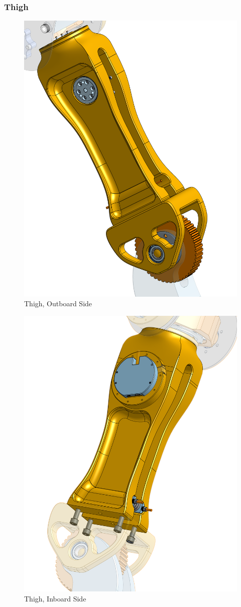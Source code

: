 \documentclass{article}
\begin{document}
\subsubsection{Thigh}

\begin{figure}
    \centering
    \includegraphics[width=0.5\linewidth]{assets/MOHRA/Sub-Leg/LegAssem_ThighWhole.png}
    \caption{Thigh, Outboard Side}
    \label{fig:enter-label}
\end{figure}
\begin{figure}
    \centering
    \includegraphics[width=0.5\linewidth]{assets/MOHRA/Sub-Leg/LegAssem_ThighMainPiece.png}
    \caption{Thigh, Inboard Side}
    \label{fig:enter-label}
\end{figure}
\end{document}
